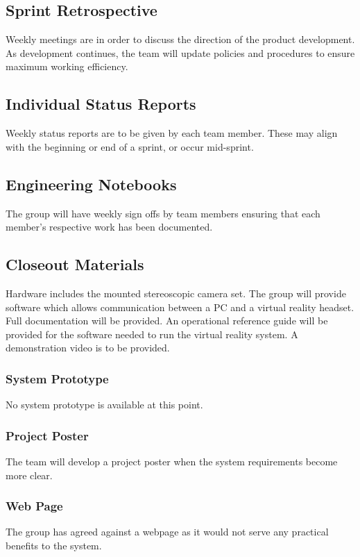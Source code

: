 \subsection{Sprint Retrospective}
Weekly meetings are in order to discuss the direction of the product development. As development continues, the team will update policies and procedures to ensure maximum working efficiency.

\subsection{Individual Status Reports}
Weekly status reports are to be given by each team member. These may align with the beginning or end of a sprint, or occur mid-sprint.

\subsection{Engineering Notebooks}
The group will have weekly sign offs by team members ensuring that each member's respective work has been documented.

\subsection{Closeout Materials}
Hardware includes the mounted stereoscopic camera set. The group will provide software which allows communication between a PC and a virtual reality headset. Full documentation will be provided. An operational reference guide will be provided for the software needed to run the virtual reality system. A demonstration video is to be provided.

\subsubsection{System Prototype}
No system prototype is available at this point.

\subsubsection{Project Poster}
The team will develop a project poster when the system requirements become more clear.

\subsubsection{Web Page}
The group has agreed against a webpage as it would not serve any practical benefits to the system.


